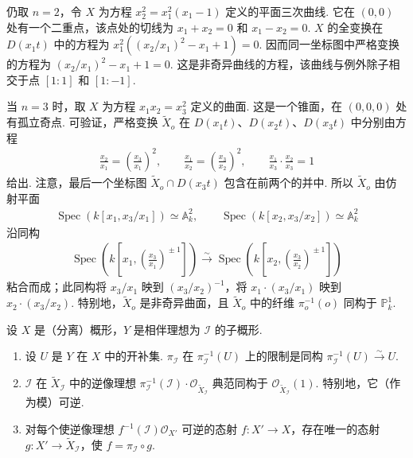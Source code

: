 \begin{example*}
仍取 $n=2$，令 $X$ 为方程 $x_2^2=x_1^2(x_1-1)$ 定义的平面三次曲线. 它在 $(0,0)$ 处有一个二重点，该点处的切线为 $x_1+x_2=0$ 和 $x_1-x_2=0$. $X$ 的全变换在 $D(x_1t)$ 中的方程为 $x_1^2((x_2/x_1)^2-x_1+1)=0$. 因而同一坐标图中严格变换的方程为 $(x_2/x_1)^2-x_1+1=0$. 这是非奇异曲线的方程，该曲线与例外除子相交于点 $[1:1]$ 和 $[1:-1]$.
\end{example*}
\begin{example*}
当 $n=3$ 时，取 $X$ 为方程 $x_1x_2=x_3^2$ 定义的曲面. 这是一个锥面，在 $(0,0,0)$ 处有孤立奇点. 可验证，严格变换 $\widetilde X_o$ 在 $D(x_1t)$、$D(x_2t)$、$D(x_3t)$ 中分别由方程
\begin{align*}
\frac{x_2}{x_1}=\left(\frac{x_3}{x_1}\right)^2,\qquad
\frac{x_1}{x_2}=\left(\frac{x_3}{x_2}\right)^2,\qquad
\frac{x_1}{x_3}\cdot\frac{x_2}{x_3}=1
\end{align*}
给出. 注意，最后一个坐标图 $\widetilde X_o\cap D(x_3t)$ 包含在前两个的并中. 所以 $\widetilde X_o$ 由仿射平面
\begin{align*}
\operatorname{Spec}(k[x_1,x_3/x_1])\simeq\mathbb A_k^2,\qquad\operatorname{Spec}(k[x_2,x_3/x_2])\simeq\mathbb A_k^2
\end{align*}
沿同构
\begin{align*}
\operatorname{Spec}\left(k\left[x_1,\left(\frac{x_3}{x_1}\right)^{\!\pm1}\right]\right)\xrightarrow\sim
\operatorname{Spec}\left(k\left[x_2,\left(\frac{x_3}{x_2}\right)^{\!\pm1}\right]\right)
\end{align*}
粘合而成；此同构将 $x_3/x_1$ 映到 $(x_3/x_2)^{-1}$，将 $x_1\cdot(x_3/x_1)$ 映到 $x_2\cdot(x_3/x_2)$. 特别地，$\widetilde X_o$ 是非奇异曲面，且 $\widetilde X_o$ 中的纤维 $\pi_o^{-1}(o)$ 同构于 $\mathbb P_k^1$.
\end{example*}
\begin{theorem}\label{item:ag-2-2-10}
设 $X$ 是（分离）概形，$Y$ 是相伴理想为 $\mathcal I$ 的子概形.
\begin{enumerate}[label=\roman*)]
\item 设 $U$ 是 $Y$ 在 $X$ 中的开补集. $\pi_{\mathcal I}$ 在 $\pi_{\mathcal I}^{-1}(U)$ 上的限制是同构 $\pi_{\mathcal I}^{-1}(U)\xrightarrow\sim U$.
\item $\mathcal I$ 在 $\widetilde X_{\mathcal I}$ 中的逆像理想 $\pi_{\mathcal I}^{-1}(\mathcal I)\cdot\mathcal O_{\widetilde X_{\mathcal I}}$ 典范同构于 $\mathcal O_{\widetilde X_{\mathcal I}}(1)$. 特别地，它（作为模）可逆.
\item 对每个使逆像理想 $f^{-1}(\mathcal I)\mathcal O_{X'}$ 可逆的态射 $f:X'\longrightarrow X$，存在唯一的态射 $g:X'\longrightarrow\widetilde X_{\mathcal I}$，使 $f=\pi_{\mathcal I}\circ g$.
\end{enumerate}
\end{theorem}
